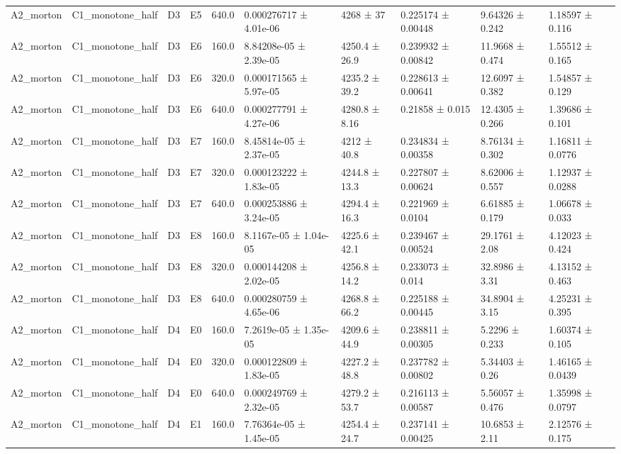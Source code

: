 \begin{table}
\begin{tabular}{llllllllll}
A2\_morton & C1\_monotone\_half & D3 & E5 & 640.0 & 0.000276717 ± 4.01e-06 & 4268 ± 37 & 0.225174 ± 0.00448 & 9.64326 ± 0.242 & 1.18597 ± 0.116 \\
A2\_morton & C1\_monotone\_half & D3 & E6 & 160.0 & 8.84208e-05 ± 2.39e-05 & 4250.4 ± 26.9 & 0.239932 ± 0.00842 & 11.9668 ± 0.474 & 1.55512 ± 0.165 \\
A2\_morton & C1\_monotone\_half & D3 & E6 & 320.0 & 0.000171565 ± 5.97e-05 & 4235.2 ± 39.2 & 0.228613 ± 0.00641 & 12.6097 ± 0.382 & 1.54857 ± 0.129 \\
A2\_morton & C1\_monotone\_half & D3 & E6 & 640.0 & 0.000277791 ± 4.27e-06 & 4280.8 ± 8.16 & 0.21858 ± 0.015 & 12.4305 ± 0.266 & 1.39686 ± 0.101 \\
A2\_morton & C1\_monotone\_half & D3 & E7 & 160.0 & 8.45814e-05 ± 2.37e-05 & 4212 ± 40.8 & 0.234834 ± 0.00358 & 8.76134 ± 0.302 & 1.16811 ± 0.0776 \\
A2\_morton & C1\_monotone\_half & D3 & E7 & 320.0 & 0.000123222 ± 1.83e-05 & 4244.8 ± 13.3 & 0.227807 ± 0.00624 & 8.62006 ± 0.557 & 1.12937 ± 0.0288 \\
A2\_morton & C1\_monotone\_half & D3 & E7 & 640.0 & 0.000253886 ± 3.24e-05 & 4294.4 ± 16.3 & 0.221969 ± 0.0104 & 6.61885 ± 0.179 & 1.06678 ± 0.033 \\
A2\_morton & C1\_monotone\_half & D3 & E8 & 160.0 & 8.1167e-05 ± 1.04e-05 & 4225.6 ± 42.1 & 0.239467 ± 0.00524 & 29.1761 ± 2.08 & 4.12023 ± 0.424 \\
A2\_morton & C1\_monotone\_half & D3 & E8 & 320.0 & 0.000144208 ± 2.02e-05 & 4256.8 ± 14.2 & 0.233073 ± 0.014 & 32.8986 ± 3.31 & 4.13152 ± 0.463 \\
A2\_morton & C1\_monotone\_half & D3 & E8 & 640.0 & 0.000280759 ± 4.65e-06 & 4268.8 ± 66.2 & 0.225188 ± 0.00445 & 34.8904 ± 3.15 & 4.25231 ± 0.395 \\
A2\_morton & C1\_monotone\_half & D4 & E0 & 160.0 & 7.2619e-05 ± 1.35e-05 & 4209.6 ± 44.9 & 0.238811 ± 0.00305 & 5.2296 ± 0.233 & 1.60374 ± 0.105 \\
A2\_morton & C1\_monotone\_half & D4 & E0 & 320.0 & 0.000122809 ± 1.83e-05 & 4227.2 ± 48.8 & 0.237782 ± 0.00802 & 5.34403 ± 0.26 & 1.46165 ± 0.0439 \\
A2\_morton & C1\_monotone\_half & D4 & E0 & 640.0 & 0.000249769 ± 2.32e-05 & 4279.2 ± 53.7 & 0.216113 ± 0.00587 & 5.56057 ± 0.476 & 1.35998 ± 0.0797 \\
A2\_morton & C1\_monotone\_half & D4 & E1 & 160.0 & 7.76364e-05 ± 1.45e-05 & 4254.4 ± 24.7 & 0.237141 ± 0.00425 & 10.6853 ± 2.11 & 2.12576 ± 0.175 \\

\end{tabular}
\end{table}
